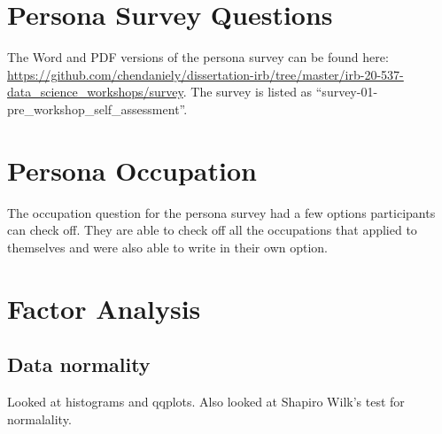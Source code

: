 \documentclass[../main.tex]{subfiles}
\begin{document}
    \section{Persona Survey Questions}

    The Word and PDF versions of the persona survey can be found here:
    \url{https://github.com/chendaniely/dissertation-irb/tree/master/irb-20-537-data\_science\_workshops/survey}.
    The survey is listed as ``survey-01-pre\_workshop\_self\_assessment''.

    \section{Persona Occupation}

        The occupation question for the persona survey had a few options participants can check off.
        They are able to check off all the occupations that applied to themselves and were also able to write in their own option.



    \section{Factor Analysis}



        \subsection{Data normality}
        \label{ss:fa-data-normality}

            Looked at histograms and qqplots.
            Also looked at Shapiro Wilk's test for normalality.


\end{document}
